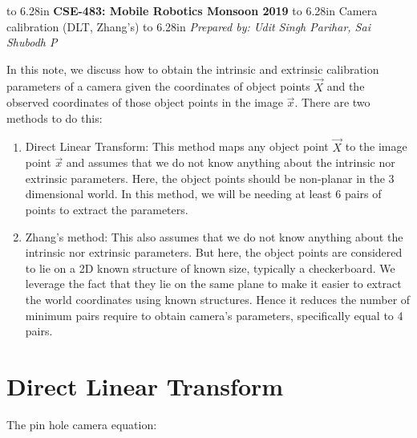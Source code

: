 \documentclass[a4paper]{article}
\begin{document}

\pagestyle{myheadings}
   \thispagestyle{plain}
   \newpage
   \noindent
   \begin{center}
   \framebox
   {
      \vbox{\vspace{2mm}
        \hbox to 6.28in { {\bf CSE-483: Mobile Robotics
	    \hfill Monsoon 2019} }
      \vspace{4mm}
        \hbox to 6.28in { {\Large \hfill Camera calibration (DLT, Zhang's)  \hfill} } %
        \vspace{2mm}
        \hbox to 6.28in { {\it Prepared by: Udit Singh Parihar, Sai Shubodh P \hfill} } %
        \vspace{2mm}}
   }
   \end{center}



In this note, we discuss how to obtain the intrinsic and extrinsic calibration parameters of a camera given the coordinates of object points $\vec{X}$ and the observed coordinates of those object points in the image $\vec{x}$. There are two methods to do this:

\begin{enumerate}
    \item Direct Linear Transform: This method maps any object point $\vec{X}$ to the image point $\vec{x}$ and assumes that we do not know anything about the intrinsic nor extrinsic parameters. Here, the object points should be non-planar in the 3 dimensional world. In this method, we will be needing at least 6 pairs of points to extract the parameters.
    \item Zhang's method: This also assumes that we do not know anything about the intrinsic nor extrinsic parameters. But here, the object points are considered to lie on a 2D known structure of known size, typically a checkerboard. We leverage the fact that they lie on the same plane to make it easier to extract the world coordinates using known structures. Hence it reduces the number of minimum pairs require to obtain camera's parameters, specifically equal to 4 pairs.
\end{enumerate}

\section{Direct Linear Transform}
The pin hole camera equation: 
\end{document}
